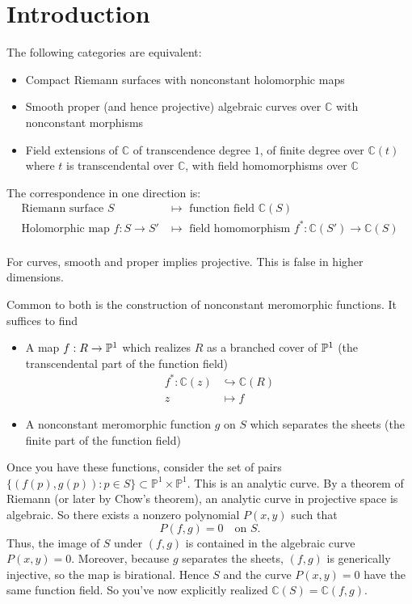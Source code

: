 \documentclass[12pt]{article}
\begin{document}
\section{Introduction}
\begin{theorem}
The following categories are equivalent:
\begin{itemize}
    \item Compact Riemann surfaces with nonconstant holomorphic maps
    \item Smooth proper (and hence projective) algebraic curves over $\mathbb{C}$ with nonconstant morphisms
    \item Field extensions of $\mathbb{C}$ of transcendence degree $1$, of finite degree over $\mathbb{C}(t)$ where $t$ is transcendental over $\mathbb{C}$, with field homomorphisms over $\mathbb{C}$
\end{itemize}

The correspondence in one direction is:
\begin{align*}
    \text{Riemann surface } S &\mapsto \text{ function field } \mathbb{C}(S) \\
    \text{Holomorphic map } f: S \to S' &\mapsto \text{ field homomorphism } f^*: \mathbb{C}(S') \to \mathbb{C}(S) \\
\end{align*}
\end{theorem}

\begin{remark}
    For curves, smooth and proper implies projective. This is false in higher dimensions.
\end{remark}
Common to both is the construction of nonconstant meromorphic functions. It suffices to find \begin{itemize}
    \item A map $f:R \to \P^1$ which realizes $R$ as a branched cover of $\P^1$ (the transcendental part of the function field) \begin{align*}
        f^*: \mathbb{C}(z) &\hookrightarrow \mathbb{C}(R) \\
        z &\mapsto f
    \end{align*}
    \item A nonconstant meromorphic function $g$ on $S$ which separates the sheets (the finite part of the function field)
\end{itemize}
Once you have these functions, consider the set of pairs $\{(f(p), g(p)) : p \in S\} \subset \mathbb{P}^1 \times \mathbb{P}^1$. This is an analytic curve. By a theorem of Riemann (or later by Chow's theorem), an analytic curve in projective space is algebraic. So there exists a nonzero polynomial $P(x,y)$ such that
\[
P(f,g) = 0 \quad \text{on } S.
\]
Thus, the image of $S$ under $(f,g)$ is contained in the algebraic curve $P(x,y)=0$. Moreover, because $g$ separates the sheets, $(f,g)$ is generically injective, so the map is birational. Hence $S$ and the curve $P(x,y)=0$ have the same function field. So you've now explicitly realized $\mathbb{C}(S) = \mathbb{C}(f,g)$.
\end{document}

